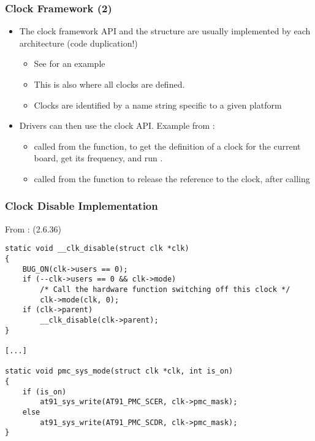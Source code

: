 \begin{frame}
  \frametitle{Clock Framework (2)}
  \begin{itemize}
  \item The clock framework API and the  structure are
    usually implemented by each architecture (code duplication!)
    \begin{itemize}
    \item See  for an example
    \item This is also where all clocks are defined.
    \item Clocks are identified by a name string specific to a given
      platform
    \end{itemize}
  \item Drivers can then use the clock API. Example from
    :
    \begin{itemize}
    \item {} called from the  function, to
      get the definition of a clock for the current board, get its
      frequency, and run .
    \item {} called from the  function to
      release the reference to the clock, after calling
    \end{itemize}
  \end{itemize}
\end{frame}

\begin{frame}[fragile]
\frametitle{Clock Disable Implementation}
From : (2.6.36)
\begin{verbatim}
static void __clk_disable(struct clk *clk)
{
    BUG_ON(clk->users == 0);
    if (--clk->users == 0 && clk->mode)
        /* Call the hardware function switching off this clock */
        clk->mode(clk, 0);
    if (clk->parent)
        __clk_disable(clk->parent);
}

[...]

static void pmc_sys_mode(struct clk *clk, int is_on)
{
    if (is_on)
        at91_sys_write(AT91_PMC_SCER, clk->pmc_mask);
    else
        at91_sys_write(AT91_PMC_SCDR, clk->pmc_mask);
}
\end{verbatim}
\end{frame}

